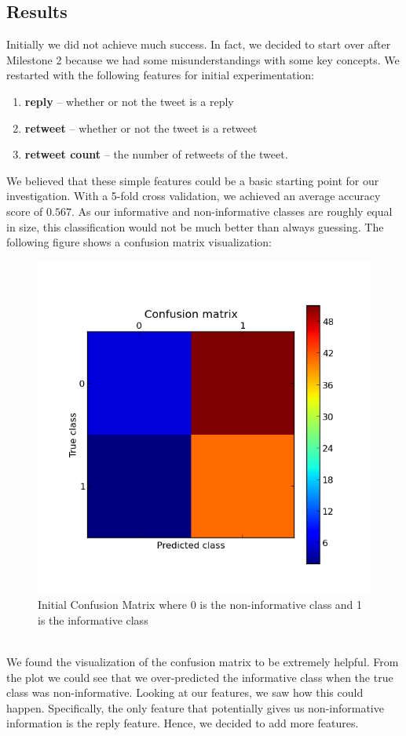 \documentclass[12pt]{article}
\begin{document}
\subsection{Results}
Initially we did not achieve much success. In fact, we decided to start over after Milestone 2 because we had some misunderstandings with some key concepts. We restarted with the following features for initial experimentation:
\begin{enumerate}
	\item \textbf{reply} -- whether or not the tweet is a reply
	\item \textbf{retweet} -- whether or not the tweet is a retweet
	\item \textbf{retweet count} -- the number of retweets of the tweet.
\end{enumerate}
We believed that these simple features could be a basic starting point for our investigation. With a 5-fold cross validation, we achieved an average accuracy score of $0.567$. As our informative and non-informative classes are roughly equal in size, this classification would not be much better than always guessing. The following figure shows a confusion matrix visualization:
\begin{figure}[h]
\centering
\includegraphics[width=14cm]{init_cfnmat.png}
\caption{Initial Confusion Matrix where 0 is the non-informative class and 1 is the informative class}
\label{fig:cfm}
\end{figure}\\
We found the visualization of the confusion matrix to be extremely helpful. From the plot we could see that we over-predicted the informative class when the true class was non-informative. Looking at our features, we saw how this could happen. Specifically, the only feature that potentially gives us non-informative information is the reply feature. Hence, we decided to add more features.
\end{document}
